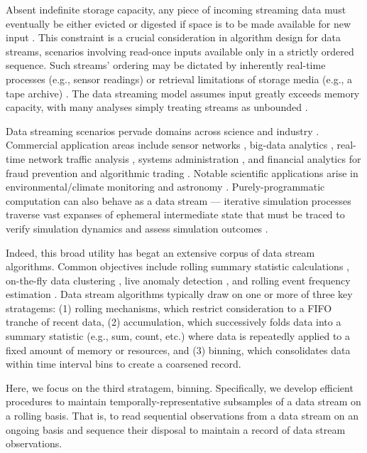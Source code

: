 Absent indefinite storage capacity, any piece of incoming streaming data must eventually be either evicted or digested if space is to be made available for new input \citep{gaber2005mining}.
This constraint is a crucial consideration in algorithm design for data streams, scenarios involving read-once inputs available only in a strictly ordered sequence.
Such streams' ordering may be dictated by inherently real-time processes (e.g., sensor readings) or retrieval limitations of storage media (e.g., a tape archive) \citep{henzinger1998computing}.
The data streaming model assumes input greatly exceeds memory capacity, with many analyses simply treating streams as unbounded \citep{jiang2006research}.

Data streaming scenarios pervade domains across science and industry \citep{aggarwal2009data,akidau2015dataflow}.
Commercial application areas include sensor networks \citep{elnahrawy2003research}, big-data analytics \citep{he2010comet}, real-time network traffic analysis \citep{johnson2005streams,muthukrishnan2005data}, systems administration \citep{fischer2012real}, and financial analytics for fraud prevention and algorithmic trading \citep{rajeshwari2016real,agarwal2009faster}.
Notable scientific applications arise in environmental/climate monitoring \citep{hill2009real} and astronomy \citep{graham2012data}.
Purely-programmatic computation can also behave as a data stream --- iterative simulation processes traverse vast expanses of ephemeral intermediate state that must be traced to verify simulation dynamics and assess simulation outcomes \citep{abdulla2004simulation,schutzel2014stream}.

Indeed, this broad utility has begat an extensive corpus of data stream algorithms.
Common objectives include rolling summary statistic calculations \citep{lin2004continuously}, on-the-fly data clustering \citep{silva2013data}, live anomaly detection \citep{cai2004maids}, and rolling event frequency estimation \citep{manku2002approximate}.
Data stream algorithms typically draw on one or more of three key stratagems: (1) rolling mechanisms, which restrict consideration to a FIFO tranche of recent data, (2) accumulation, which successively folds data into a summary statistic (e.g., sum, count, etc.) where data is repeatedly applied to a fixed amount of memory or resources, and (3) binning, which consolidates data within time interval bins to create a coarsened record.

Here, we focus on the third stratagem, binning.
Specifically, we develop efficient procedures to maintain temporally-representative subsamples of a data stream on a rolling basis.
That is, to read sequential observations from a data stream on an ongoing basis and sequence their disposal to maintain a record of data stream observations.

